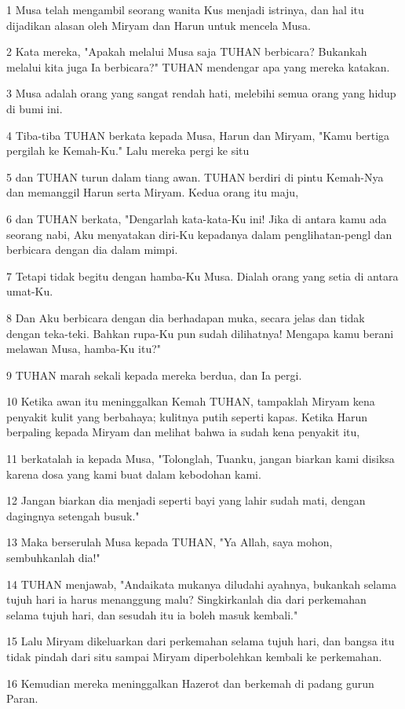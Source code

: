\par 1 Musa telah mengambil seorang wanita Kus menjadi istrinya, dan hal itu dijadikan alasan oleh Miryam dan Harun untuk mencela Musa.
\par 2 Kata mereka, "Apakah melalui Musa saja TUHAN berbicara? Bukankah melalui kita juga Ia berbicara?" TUHAN mendengar apa yang mereka katakan.
\par 3 Musa adalah orang yang sangat rendah hati, melebihi semua orang yang hidup di bumi ini.
\par 4 Tiba-tiba TUHAN berkata kepada Musa, Harun dan Miryam, "Kamu bertiga pergilah ke Kemah-Ku." Lalu mereka pergi ke situ
\par 5 dan TUHAN turun dalam tiang awan. TUHAN berdiri di pintu Kemah-Nya dan memanggil Harun serta Miryam. Kedua orang itu maju,
\par 6 dan TUHAN berkata, "Dengarlah kata-kata-Ku ini! Jika di antara kamu ada seorang nabi, Aku menyatakan diri-Ku kepadanya dalam penglihatan-pengl dan berbicara dengan dia dalam mimpi.
\par 7 Tetapi tidak begitu dengan hamba-Ku Musa. Dialah orang yang setia di antara umat-Ku.
\par 8 Dan Aku berbicara dengan dia berhadapan muka, secara jelas dan tidak dengan teka-teki. Bahkan rupa-Ku pun sudah dilihatnya! Mengapa kamu berani melawan Musa, hamba-Ku itu?"
\par 9 TUHAN marah sekali kepada mereka berdua, dan Ia pergi.
\par 10 Ketika awan itu meninggalkan Kemah TUHAN, tampaklah Miryam kena penyakit kulit yang berbahaya; kulitnya putih seperti kapas. Ketika Harun berpaling kepada Miryam dan melihat bahwa ia sudah kena penyakit itu,
\par 11 berkatalah ia kepada Musa, "Tolonglah, Tuanku, jangan biarkan kami disiksa karena dosa yang kami buat dalam kebodohan kami.
\par 12 Jangan biarkan dia menjadi seperti bayi yang lahir sudah mati, dengan dagingnya setengah busuk."
\par 13 Maka berserulah Musa kepada TUHAN, "Ya Allah, saya mohon, sembuhkanlah dia!"
\par 14 TUHAN menjawab, "Andaikata mukanya diludahi ayahnya, bukankah selama tujuh hari ia harus menanggung malu? Singkirkanlah dia dari perkemahan selama tujuh hari, dan sesudah itu ia boleh masuk kembali."
\par 15 Lalu Miryam dikeluarkan dari perkemahan selama tujuh hari, dan bangsa itu tidak pindah dari situ sampai Miryam diperbolehkan kembali ke perkemahan.
\par 16 Kemudian mereka meninggalkan Hazerot dan berkemah di padang gurun Paran.

